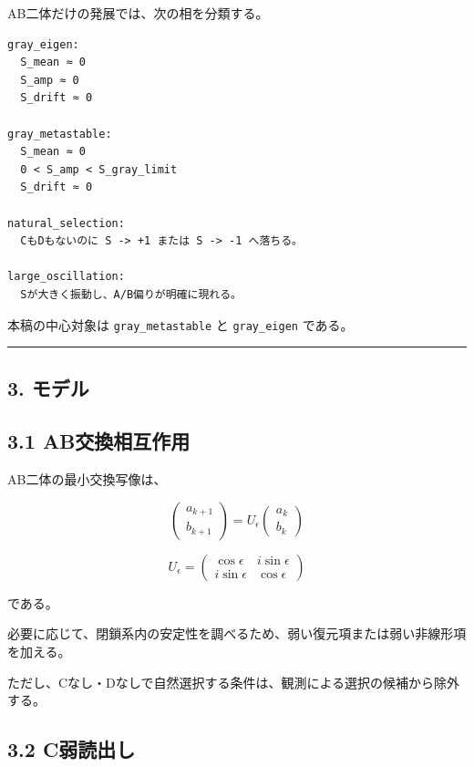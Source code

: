 \documentclass{article}
\begin{document}
AB二体だけの発展では、次の相を分類する。

\begin{verbatim}
gray_eigen:
  S_mean ≈ 0
  S_amp ≈ 0
  S_drift ≈ 0

gray_metastable:
  S_mean ≈ 0
  0 < S_amp < S_gray_limit
  S_drift ≈ 0

natural_selection:
  CもDもないのに S -> +1 または S -> -1 へ落ちる。

large_oscillation:
  Sが大きく振動し、A/B偏りが明確に現れる。
\end{verbatim}

本稿の中心対象は \texttt{gray\_metastable} と \texttt{gray\_eigen}
である。

\begin{center}\rule{0.5\linewidth}{0.5pt}\end{center}

\subsection{3. モデル}\label{ux30e2ux30c7ux30eb}

\subsection{3.1
AB交換相互作用}\label{abux4ea4ux63dbux76f8ux4e92ux4f5cux7528}

AB二体の最小交換写像は、

\[
\begin{pmatrix}
a_{k+1}\\
b_{k+1}
\end{pmatrix}
=
U_\epsilon
\begin{pmatrix}
a_k\\
b_k
\end{pmatrix}
\]

\[
U_\epsilon
=
\begin{pmatrix}
\cos\epsilon & i\sin\epsilon\\
i\sin\epsilon & \cos\epsilon
\end{pmatrix}
\]

である。

必要に応じて、閉鎖系内の安定性を調べるため、弱い復元項または弱い非線形項を加える。

ただし、Cなし・Dなしで自然選択する条件は、観測による選択の候補から除外する。

\subsection{3.2 C弱読出し}\label{cux5f31ux8aadux51faux3057}
\end{document}
